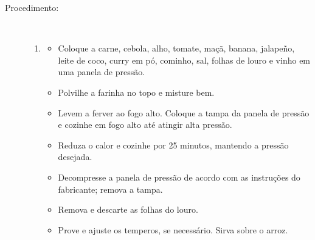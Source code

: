 \documentclass [11pt, letterpaper] {article}
\begin{document}
\begin {description}
\item [Procedimento:] \ \\
\begin {enumerate}
\item {\bf}
\begin {itemize}
\item Coloque a carne, cebola, alho, tomate, maçã, banana, jalapeño, leite de coco, curry em pó, cominho, sal, folhas de louro e vinho em uma panela de pressão.
\item Polvilhe a farinha no topo e misture bem.
\item Levem a ferver ao fogo alto. Coloque a tampa da panela de pressão e cozinhe em fogo alto até atingir alta pressão.
\item Reduza o calor e cozinhe por 25 minutos, mantendo a pressão desejada.
\item Decompresse a panela de pressão de acordo com as instruções do fabricante; remova a tampa.
\item Remova e descarte as folhas do louro.
\item Prove e ajuste os temperos, se necessário. Sirva sobre o arroz.
\end {itemize}
\end {enumerate}
\end {description}
\end{document}
